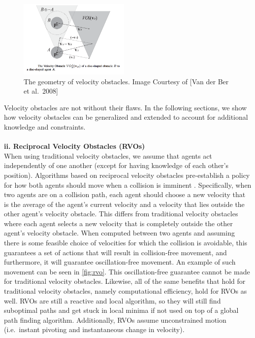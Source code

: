 \documentclass[tog]{acmsiggraph}
\begin{document}
\begin{figure}[h]
  \begin{center}
    \includegraphics[width=0.48\textwidth]{images/VO}
  \end{center}
  \caption{The geometry of velocity obstacles. Image Courtesy of [Van der Ber et al.\ 2008] }
  \label{fig:vo}
\end{figure}

Velocity obstacles are not without their flaws. In the following sections, we show how velocity obstacles can be generalized and extended to account for additional knowledge and constraints.  
\\ \\
\textbf{ii. Reciprocal Velocity Obstacles (RVOs)}
\\
When using traditional velocity obstacles, we assume that agents act independently of one another (except for having knowledge of each other's position). Algorithms based on reciprocal velocity obstacles pre-establish a policy for how both agents should move when a collision is imminent \cite{van2008reciprocal}. Specifically, when two agents are on a collision path, each agent should choose a new velocity that is the average of the agent’s current velocity and a velocity that lies outside the other agent’s velocity obstacle. This differs from traditional velocity obstacles where each agent selects a new velocity that is completely outside the other agent’s velocity obstacle. When computed between two agents and assuming there is some feasible choice of velocities for which the collision is avoidable, this guarantees a set of actions that will result in collision-free movement, and furthermore, it will guarantee oscillation-free movement. An example of such movement can be seen in \ref{fig:rvo}. This oscillation-free guarantee cannot be made for traditional velocity obstacles. Likewise, all of the same benefits that hold for traditional velocity obstacles, namely computational efficiency, hold for RVOs as well. RVOs are still a reactive and local algorithm, so they will still find suboptimal paths and get stuck in local minima if not used on top of a global path finding algorithm. Additionally, RVOs assume unconstrained motion (i.e.\ instant pivoting and instantaneous change in velocity).
\end{document}

